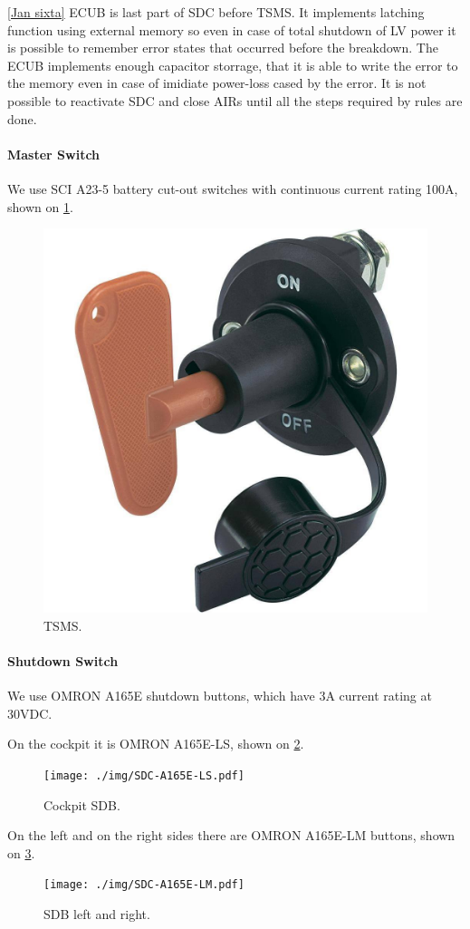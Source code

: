 \ref{Jan sixta}
ECUB is last part of SDC before TSMS. It implements latching function using external memory so even in case of total shutdown of LV power it is possible to remember error states that occurred before the breakdown. The ECUB implements enough capacitor storrage, that it is able to write the error to the memory even in case of imidiate power-loss cased by the error. It is not possible to reactivate SDC and close AIRs until all the steps required by rules are done.

\paragraph{Master Switch}
We use SCI A23-5 battery cut-out switches with continuous current rating 100A, shown on \ref{fig:SDC-TSMS}.
\begin{figure}[H]
	\centering
	\includegraphics[width=.5\textwidth]{./img/SDC-TSMS.jpg}
	\caption{TSMS.}
	\label{fig:SDC-TSMS}
\end{figure}

\paragraph{Shutdown Switch}
We use OMRON A165E shutdown buttons, which have 3A current rating at 30VDC.

On the cockpit it is OMRON A165E-LS, shown on \ref{fig:SDC-A165E-LS}.
\begin{figure}[H]
	\centering
	\texttt{[image: ./img/SDC-A165E-LS.pdf]}
	\caption{Cockpit SDB.}
	\label{fig:SDC-A165E-LS}
\end{figure}

On the left and on the right sides there are OMRON A165E-LM buttons, shown on \ref{fig:SDC-A165E-LM}.
\begin{figure}[H]
	\centering
	\texttt{[image: ./img/SDC-A165E-LM.pdf]}
	\caption{SDB left and right.}
	\label{fig:SDC-A165E-LM}
\end{figure}

